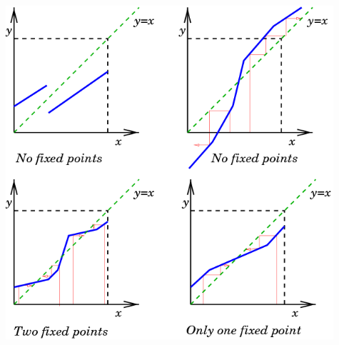 \documentclass{beamer}
\begin{document}
\begin{frame}
\begin{columns}
\begin{column}{0.5\textwidth}
\begin{overlayarea}{\textwidth}{0.6\textheight}
      \end{overlayarea}
    \end{column}
    \begin{column}{0.5\textwidth}
      \begin{center}
        \includegraphics[width=0.95\textwidth]{figures/contract_examples}
      \end{center}
    \end{column}
  \end{columns}

\end{frame}
\end{document}
